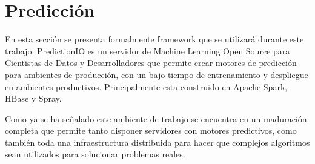 

\section{Predicción }

  	
  En esta sección se presenta formalmente framework que se utilizará durante este trabajo. %
  PredictionIO es un servidor de Machine Learning Open Source para Cientistas de Datos y Desarrolladores que permite crear motores de predicción para ambientes de producción, con un bajo tiempo de entrenamiento y despliegue en ambientes productivos. Principalmente esta construido en Apache Spark, HBase y Spray.

  Como ya se ha señalado este ambiente de trabajo se encuentra en un maduración completa que permite tanto disponer  servidores con motores predictivos, como también toda una infraestructura distribuida para hacer que complejos algoritmos sean utilizados para solucionar problemas reales.














